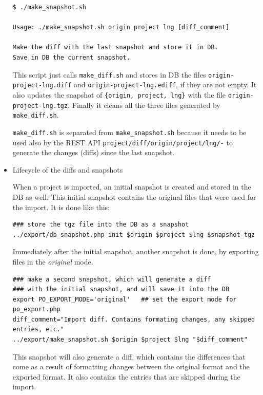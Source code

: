 \documentclass[11pt]{article}
\begin{document}
\begin{itemize}
\begin{verbatim}
$ ./make_snapshot.sh

Usage: ./make_snapshot.sh origin project lng [diff_comment]

Make the diff with the last snapshot and store it in DB.
Save in DB the current snapshot.
\end{verbatim}



     This script just calls \texttt{make\_diff.sh} and stores in DB the files
     \texttt{origin-project-lng.diff} and \texttt{origin-project-lng.ediff}, if they
     are not empty. It also updates the snapshot of \texttt{\{origin, project,      lng\}} with the file \texttt{origin-project-lng.tgz}. Finally it cleans all
     the three files generated by \texttt{make\_diff.sh}.

     \texttt{make\_diff.sh} is separated from \texttt{make\_snapshot.sh} because it
     needs to be used also by the REST API
     \texttt{project/diff/origin/project/lng/-} to generate the
     changes (diffs) since the last snapshot.



\item Lifecycle of the diffs and snapshots\\
\label{sec-8.4.4.5}


     When a project is imported, an initial snapshot is created and
     stored in the DB as well. This initial snapshot contains the
     original files that were used for the import. It is done like this:

\begin{verbatim}
### store the tgz file into the DB as a snapshot
../export/db_snapshot.php init $origin $project $lng $snapshot_tgz
\end{verbatim}



     Immediately after the initial snapshot, another snapshot is done,
     by exporting files in the \emph{original} mode.

\begin{verbatim}
### make a second snapshot, which will generate a diff
### with the initial snapshot, and will save it into the DB
export PO_EXPORT_MODE='original'   ## set the export mode for po_export.php
diff_comment="Import diff. Contains formating changes, any skipped entries, etc."
../export/make_snapshot.sh $origin $project $lng "$diff_comment"
\end{verbatim}


     This snapshot will also generate a diff, which contains the
     differences that come as a result of formatting changes between the
     original format and the exported format. It also contains the
     entries that are skipped during the import.
     

\end{itemize}
\end{document}
